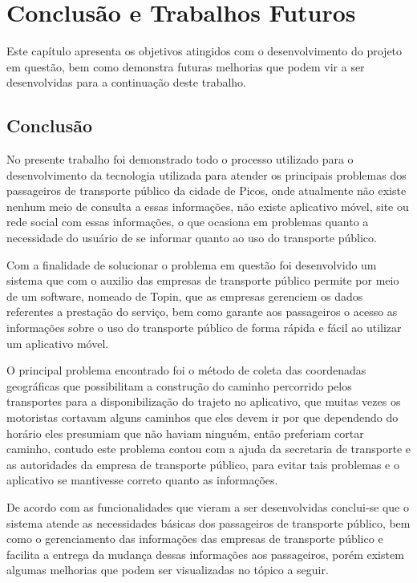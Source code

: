 \chapter{Conclusão e Trabalhos Futuros}

Este capítulo apresenta os objetivos atingidos com o desenvolvimento do projeto em questão, bem como demonstra futuras melhorias que podem vir a ser desenvolvidas para a continuação deste trabalho.

\section{Conclusão}

No presente trabalho foi demonstrado todo o processo utilizado para o desenvolvimento da tecnologia utilizada para atender os principais problemas dos passageiros de transporte público da cidade de Picos, onde atualmente não existe nenhum meio de consulta a essas informações, não existe aplicativo móvel, site ou rede social com essas informações, o que ocasiona em problemas quanto a necessidade do usuário de se informar quanto ao uso do transporte público.

Com a finalidade de solucionar o problema em questão foi desenvolvido um sistema que com o auxilio das empresas de transporte público permite por meio de um software, nomeado de Topin, que as empresas gerenciem os dados referentes a prestação do serviço, bem como garante aos passageiros o acesso as informações sobre o uso do transporte público de forma rápida e fácil ao utilizar um aplicativo móvel.

O principal problema encontrado foi o método de coleta das coordenadas geográficas que possibilitam a construção do caminho percorrido pelos transportes para a disponibilização do trajeto no aplicativo, que muitas vezes os motoristas cortavam alguns caminhos que eles devem ir por que dependendo do horário eles presumiam que não haviam ninguém, então preferiam cortar caminho, contudo este problema contou com a ajuda da secretaria de transporte e as autoridades da empresa de transporte público, para evitar tais problemas e o aplicativo se mantivesse correto quanto as informações.

De acordo com as funcionalidades que vieram a ser desenvolvidas conclui-se que o sistema atende as necessidades básicas dos passageiros de transporte público, bem como o gerenciamento das informações das empresas de transporte público e facilita a entrega da mudança dessas informações aos passageiros, porém existem algumas melhorias que podem ser visualizadas no tópico a seguir.


